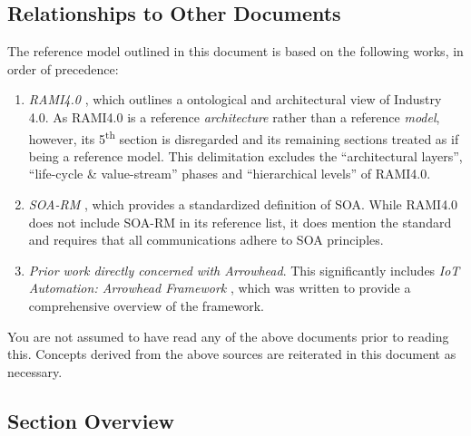 \subsection{Relationships to Other Documents}
\label{sec:introduction:relationships}

The reference model outlined in this document is based on the following works, in order of precedence:

\begin{enumerate}
\item \textit{RAMI4.0} \cite{adolphs2016reference}, which outlines a ontological and architectural view of Industry 4.0.
As RAMI4.0 is a reference \textit{architecture} rather than a reference \textit{model}, however, its 5\textsuperscript{th} section is disregarded and its remaining sections treated as if being a reference model.
This delimitation excludes the ``architectural layers'', ``life-cycle \& value-stream'' phases and ``hierarchical levels'' of RAMI4.0.

\item \textit{SOA-RM} \cite{mackenzie2006reference}, which provides a standardized definition of SOA.
While RAMI4.0 does not include SOA-RM in its reference list, it does mention the standard and requires that all communications adhere to SOA principles. 

\item \textit{Prior work directly concerned with Arrowhead}.
This significantly includes \textit{IoT Automation: Arrowhead Framework} \cite{delsing2017iot}, which was written to provide a comprehensive overview of the framework.

\end{enumerate}

You are not assumed to have read any of the above documents prior to reading this.
Concepts derived from the above sources are reiterated in this document as necessary.

\subsection{Section Overview}
\label{sec:introduction:sections}

